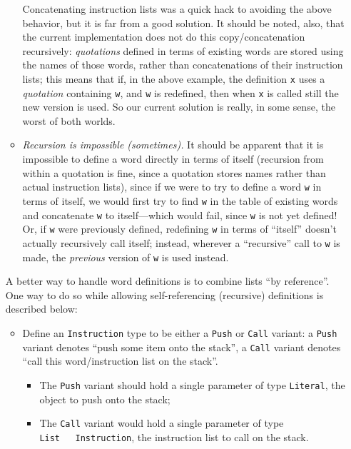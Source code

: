\documentclass[
]{article}
\begin{document}
\begin{itemize}
\begin{itemize}
    Concatenating instruction lists was a quick hack to avoiding the
    above behavior, but it is far from a good solution. It should be
    noted, also, that the current implementation does not do this
    copy/concatenation recursively: \emph{quotations} defined in terms
    of existing words are stored using the names of those words, rather
    than concatenations of their instruction lists; this means that if,
    in the above example, the definition \texttt{x} uses a
    \emph{quotation} containing \texttt{w}, and \texttt{w} is redefined,
    then when \texttt{x} is called still the new version is used. So our
    current solution is really, in some sense, the worst of both worlds.
  \item
    \emph{Recursion is impossible (sometimes).} It should be apparent
    that it is impossible to define a word directly in terms of itself
    (recursion from within a quotation is fine, since a quotation stores
    names rather than actual instruction lists), since if we were to try
    to define a word \texttt{w} in terms of itself, we would first try
    to find \texttt{w} in the table of existing words and concatenate
    \texttt{w} to itself---which would fail, since \texttt{w} is not yet
    defined! Or, if \texttt{w} were previously defined, redefining
    \texttt{w} in terms of ``itself'' doesn't actually recursively call
    itself; instead, wherever a ``recursive'' call to \texttt{w} is
    made, the \emph{previous} version of \texttt{w} is used instead.
  \end{itemize}

  A better way to handle word definitions is to combine lists ``by
  reference''. One way to do so while allowing self-referencing
  (recursive) definitions is described below:

  \begin{itemize}
  \item
    Define an \texttt{Instruction} type to be either a \texttt{Push} or
    \texttt{Call} variant: a \texttt{Push} variant denotes ``push some
    item onto the stack'', a \texttt{Call} variant denotes ``call this
    word/instruction list on the stack''.

    \begin{itemize}
    \item
      The \texttt{Push} variant should hold a single parameter of type
      \texttt{Literal}, the object to push onto the stack;
    \item
      The \texttt{Call} variant would hold a single parameter of type
      \texttt{List\ \ \ Instruction}, the instruction list to call on
      the stack.


\end{itemize}
\end{itemize}
\end{itemize}
\end{document}
